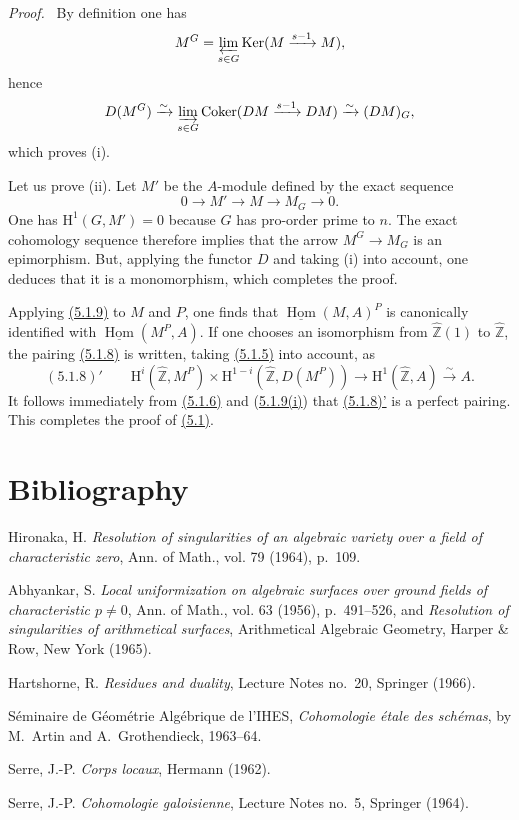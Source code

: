 \documentclass[11pt]{article}
\providecommand{\uHom}{\underline{\Hom}}
\newenvironment{prooftext}[1][Proof]{\par\noindent\emph{#1.}\ }{\par\medskip}
\renewcommand{\H}{\mathrm{H}}
\DeclareMathOperator{\Hom}{Hom}
\newcommand{\Z}{\mathbb{Z}}
\providecommand{\Ker}{\operatorname{Ker}}
\providecommand{\Coker}{\operatorname{Coker}}
\providecommand{\Hom}{\operatorname{Hom}}
\providecommand{\Ker}{\operatorname{Ker}}
\providecommand{\Coker}{\operatorname{Coker}}
\providecommand{\Ker}{\operatorname{Ker}}
\providecommand{\Coker}{\operatorname{Coker}}
\providecommand{\Z}{\mathbb Z}
\providecommand{\Hom}{\operatorname{Hom}}
\begin{document}
\begin{prooftext}[Proof]
By definition one has
\[
M^G=\varprojlim_{s\in G}\Ker(M\xrightarrow{s-1}M),
\]
hence
\[
D(M^G)\xrightarrow{\sim}\varinjlim_{s\in G}\Coker(DM\xrightarrow{s-1}DM)\xrightarrow{\sim}(DM)_G,
\]
which proves (i).

Let us prove (ii). Let $M'$ be the $A$-module defined by the exact sequence
\[
0\longrightarrow M'\longrightarrow M\longrightarrow M_G\longrightarrow0.
\]
One has $\H^1(G,M')=0$ because $G$ has pro-order prime to $n$. The exact cohomology sequence therefore implies that the arrow $M^G\to M_G$ is an epimorphism. But, applying the functor $D$ and taking (i) into account, one deduces that it is a monomorphism, which completes the proof.
\end{prooftext}

Applying \hyperref[sga5:I:lemma:5.1.9]{(5.1.9)} to $M$ and $P$, one finds that $\uHom(M,A)^P$ is canonically identified with $\uHom(M^P,A)$. If one chooses an isomorphism from $\widehat{\Z}(1)$ to $\widehat{\Z}$, the pairing \hyperref[sga5:I:equation:5.1.8]{(5.1.8)} is written, taking \hyperref[sga5:I:equation:5.1.5]{(5.1.5)} into account, as
\label{sga5:I:equation:5.1.8:2}\[
(5.1.8)'\qquad \H^i(\widehat{\Z},M^P)\times\H^{1-i}(\widehat{\Z},D(M^P))\longrightarrow\H^1(\widehat{\Z},A)\xrightarrow{\sim}A.
\]
It follows immediately from \hyperref[sga5:I:equation:5.1.6]{(5.1.6)} and (\hyperref[sga5:I:lemma:5.1.9]{5.1.9(i)}) that \hyperref[sga5:I:equation:5.1.8:2]{(5.1.8)'} is a perfect pairing. This completes the proof of \hyperref[sga5:I:theorem:5.1]{(5.1)}.

\section*{Bibliography}

\begin{description}[leftmargin=2.5cm,style=nextline]
\item[{[2]}] Hironaka, H. \emph{Resolution of singularities of an algebraic variety over a field of characteristic zero}, Ann. of Math., vol. 79 (1964), p.~109.
\item[{[1]}] Abhyankar, S. \emph{Local uniformization on algebraic surfaces over ground fields of characteristic $p\ne0$}, Ann. of Math., vol. 63 (1956), p.~491--526, and \emph{Resolution of singularities of arithmetical surfaces}, Arithmetical Algebraic Geometry, Harper \& Row, New York (1965).
\item[{[H]}] Hartshorne, R. \emph{Residues and duality}, Lecture Notes no.~20, Springer (1966).
\item[{[SGAA]}] Séminaire de Géométrie Algébrique de l'IHES, \emph{Cohomologie étale des schémas}, by M.~Artin and A.~Grothendieck, 1963--64.
\item[{[CL]}] Serre, J.-P. \emph{Corps locaux}, Hermann (1962).
\item[{[CG]}] Serre, J.-P. \emph{Cohomologie galoisienne}, Lecture Notes no.~5, Springer (1964).
\end{description}
\end{document}
